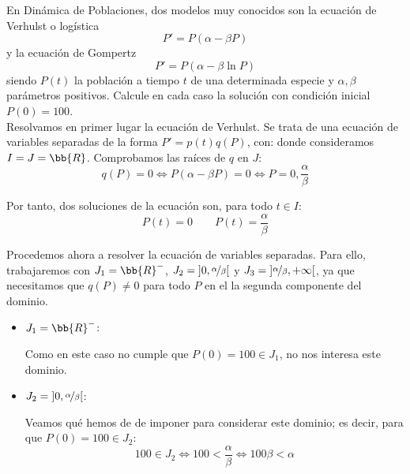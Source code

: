 \begin{ejercicio}
    En Dinámica de Poblaciones, dos modelos muy conocidos son la ecuación de Verhulst o logística
    \begin{equation*}
        P' = P(\alpha - \beta P)
    \end{equation*}
    y la ecuación de Gompertz
    \begin{equation*}
        P' = P(\alpha - \beta \ln P)
    \end{equation*}
    siendo $P(t)$ la población a tiempo $t$ de una determinada especie y $\alpha, \beta$ parámetros positivos. Calcule en cada caso la solución con condición inicial $P(0) = 100$.\\

    Resolvamos en primer lugar la ecuación de Verhulst. Se trata de una ecuación de variables separadas de la forma $P' = p(t)q(P)$, con:
    donde consideramos $I=J=\bb{R}$. Comprobamos las raíces de $q$ en $J$:
    \begin{equation*}
        q(P) = 0 \Longleftrightarrow P(\alpha - \beta P) = 0 \Longleftrightarrow P=0, \dfrac{\alpha}{\beta}
    \end{equation*}

    Por tanto, dos soluciones de la ecuación son, para todo $t\in I$:
    \begin{equation*}
        P(t) = 0 \qquad P(t) = \dfrac{\alpha}{\beta}
    \end{equation*}

    Procedemos ahora a resolver la ecuación de variables separadas. Para ello, trabajaremos con $J_1=\bb{R}^-$, $J_2=\left]0, \nicefrac{\alpha}{\beta}\right[$ y $J_3=\left]\nicefrac{\alpha}{\beta}, +\infty\right[$,
    ya que necesitamos que $q(P)\neq 0$ para todo $P$ en el la segunda componente del dominio.
    \begin{itemize}
        \item \ul{$J_1=\bb{R}^-$}:
        
        Como en este caso no cumple que $P(0)=100\in J_1$, no nos interesa este dominio.

        \item \ul{$J_2=\left]0, \nicefrac{\alpha}{\beta}\right[$}:
        
        Veamos qué hemos de de imponer para considerar este dominio; es decir, para que $P(0)=100\in J_2$:
        \begin{equation*}
            100\in J_2 \Longleftrightarrow 100<\dfrac{\alpha}{\beta} \Longleftrightarrow 100\beta<\alpha
        \end{equation*}
        

\end{itemize}
\end{ejercicio}
